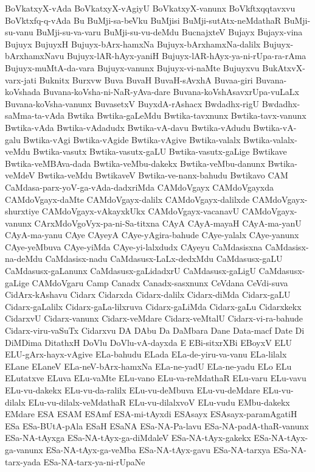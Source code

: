 {BoVkatxyX-vAda
BoVkatxyX-vAgiyU
BoVkatxyX-vanunx
BoVkftxqqtavxvu
BoVktxfq-q-vAda
Bu
BuMji-sa-beVku
BuMjisi
BuMji-sutAtx-neMdathaR
BuMji-su-vanu
BuMji-su-va-varu
BuMji-su-vu-deMdu
BucnajxteV
Bujayx
Bujayx-vina
Bujuyx
BujuyxH
Bujuyx-bArx-hamxNa
Bujuyx-bArxhamxNa-dalilx
Bujuyx-bArxhamxNavu
Bujuyx-lAR-hAyx-yaniH
Bujuyx-lAR-hAyx-ya-ni-rUpa-ra-rAma
Bujuyx-muMtA-da-vara
Bujuyx-vanunx
Bujuyx-vi-naMte
Bujuyxvu
BukAtxvX-varx-jati
Buknitx
Burxvw
Buva
BuvaH
BuvaH-sAvxhA
Buvaa-giri
Buvana-koVshada
Buvana-koVsha-ni-NaR-yAva-dare
Buvana-koVshAsavxrUpa-vuLaLx
Buvana-koVsha-vanunx
BuvasetxV
BuyxdA-rAshacx
Bwdadhx-rigU
Bwdadhx-saMma-ta-vAda
Bwtika
Bwtika-gaLeMdu
Bwtika-tavxnunx
Bwtika-tavx-vanunx
Bwtika-vAda
Bwtika-vAdadudx
Bwtika-vA-davu
Bwtika-vAdudu
Bwtika-vA-galu
Bwtika-vAgi
Bwtika-vAgide
Bwtika-vAgive
Bwtika-valalx
Bwtika-valalx-veMdu
Bwtika-vasutx
Bwtika-vasutx-gaLU
Bwtika-vasutx-gaLige
Bwtikave
Bwtika-veMBAva-dada
Bwtika-veMbu-dakekx
Bwtika-veMbu-danunx
Bwtika-veMdeV
Bwtika-veMdu
BwtikaveV
Bwtika-ve-nanx-bahudu
Bwtikavo
CAM
CaMdasa-parx-yoV-ga-vAda-dadxriMda
CAMdoVgayx
CAMdoVgayxda
CAMdoVgayx-daMte
CAMdoVgayx-dalilx
CAMdoVgayx-dalilxde
CAMdoVgayx-shurxtiye
CAMdoVgayx-vAkayxkUkx
CAMdoVgayx-vacanavU
CAMdoVgayx-vanunx
CArxMdoVgoVyx-pa-ni-Sa-titxna
CAyA
CAyA-mayaH
CAyA-ma-yanU
CAyA-ma-yanu
CAye
CAyeyA
CAye-yAgira-bahude
CAye-yalalx
CAye-yanunx
CAye-yeMbuva
CAye-yiMda
CAye-yi-lalxdudx
CAyeyu
CaMdasisxna
CaMdasisx-na-deMdu
CaMdasisx-nadu
CaMdasusx-LaLx-dedxMdu
CaMdasusx-gaLU
CaMdasusx-gaLanunx
CaMdasusx-gaLidadxrU
CaMdasusx-gaLigU
CaMdasusx-gaLige
CAMdoVgaru
Camp
Canadx
Canadx-sasxnunx
CeVdana
CeVdi-suva
CidArx-kAshavu
Cidarx
Cidarxda
Cidarx-dalilx
Cidarx-diMda
Cidarx-gaLU
Cidarx-gaLalilx
Cidarx-gaLa-lilxruva
Cidarx-gaLiMda
Cidarx-gaLu
Cidarxkekx
CidarxvU
Cidarx-vanunx
Cidarx-veMdare
Cidarx-veMtalU
Cidarx-vi-ra-bahude
Cidarx-viru-vaSuTx
Cidarxvu
DA
DAbu
Da
DaMbara
Dane
Data-macf
Date
Di
DiMDima
DitathxH
DoVlu
DoVlu-vA-dayxda
E
EBi-sitxrXBi
EBoyxV
ELU
ELU-gArx-hayx-vAgive
ELa-bahudu
ELada
ELa-de-yiru-va-vanu
ELa-lilalx
ELane
ELaneV
ELa-neV-bArx-hamxNa
ELa-ne-yadU
ELa-ne-yadu
ELo
ELu
ELutatxve
ELuva
ELu-vaMte
ELu-vano
ELu-va-reMdathaR
ELu-varu
ELu-vavu
ELu-vu-dakekx
ELu-vu-da-ralilx
ELu-vu-deMbuva
ELu-vu-deMdare
ELu-vu-dilalx
ELu-vu-dilalx-veMdathaR
ELu-vu-dilalxvoV
ELu-vudu
EMbu-dakekx
EMdare
ESA
ESAM
ESAmf
ESA-mi-tAyxdi
ESAsayx
ESAsayx-paramAgatiH
ESa
ESa-BUtA-pAla
ESaH
ESaNA
ESa-NA-Pa-lavu
ESa-NA-padA-thaR-vanunx
ESa-NA-tAyxga
ESa-NA-tAyx-ga-diMdaleV
ESa-NA-tAyx-gakekx
ESa-NA-tAyx-ga-vanunx
ESa-NA-tAyx-ga-veMba
ESa-NA-tAyx-gavu
ESa-NA-tarxya
ESa-NA-tarx-yada
ESa-NA-tarx-ya-ni-rUpaNe
}
